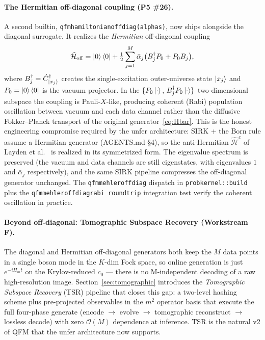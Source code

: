 \documentclass[11pt, a4paper]{article}
\newcommand{\Hgen}{\hat{\mathcal{H}}}
\begin{document}
\paragraph{The Hermitian off-diagonal coupling (P5 \#26).} A second builtin,
\texttt{qfm\textunderscore hamiltonian\textunderscore offdiag(alphas)}, now
ships alongside the diagonal surrogate. It realizes the \emph{Hermitian}
off-diagonal coupling
\begin{equation}
  \Hgen_{\mathrm{off}}=\ket{0}\bra{0}+\tfrac12\sum_{j=1}^M\bar\alpha_j
  \bigl(B_j^\dagger P_0+P_0 B_j\bigr),
  \label{eq:Hoff}
\end{equation}
where $B_j^\dagger=\hat C^\dagger_{\ket{x_j}}$ creates the single-excitation
outer-universe state $\ket{x_j}$ and $P_0=\ket{0}\bra{0}$ is the vacuum
projector. In the $\{P_0\ket{\cdot},\,B_j^\dagger P_0\ket{\cdot}\}$
two-dimensional subspace the coupling is Pauli-$X$-like, producing coherent
(Rabi) population oscillation between vacuum and each data channel rather than
the diffusive Fokker--Planck transport of the original
generator~\eqref{eq:Hbar}. This is the honest engineering compromise required
by the unfer architecture: SIRK + the Born rule assume a Hermitian generator
(AGENTS.md \S4), so the anti-Hermitian $\Hgen^c$ of
Layden et al.~\cite{Layden2025} is realized in its symmetrized form. The
eigenvalue spectrum is preserved (the vacuum and data channels are still
eigenstates, with eigenvalues $1$ and $\bar\alpha_j$ respectively), and the
same SIRK pipeline compresses the off-diagonal generator unchanged. The
\texttt{qfm\textunderscore mehler\textunderscore offdiag} dispatch in
\texttt{prob\textunderscore kernel::build} plus the
\texttt{qfm\textunderscore mehler\textunderscore offdiag\textunderscore rabi\textunderscore
round\textunderscore trip} integration test verify the coherent
oscillation in practice.

\paragraph{Beyond off-diagonal: Tomographic Subspace Recovery (Workstream F).}
The diagonal and Hermitian off-diagonal generators both keep the $M$ data
points in a single boson mode in the $K$-dim Fock space, so online
generation is just $e^{-iH_m t}$ on the Krylov-reduced $c_0$ --- there is
no M-independent decoding of a raw high-resolution image. Section~\ref{sec:tomographic}
introduces the \emph{Tomographic Subspace Recovery} (TSR) pipeline that closes
this gap: a two-level hashing scheme plus pre-projected observables in the
$m^2$ operator basis that execute the full four-phase generate
(encode $\to$ evolve $\to$ tomographic reconstruct $\to$ lossless decode) with
zero $\mathcal{O}(M)$ dependence at inference. TSR is the natural v2 of QFM
that the unfer architecture now supports.
\end{document}
